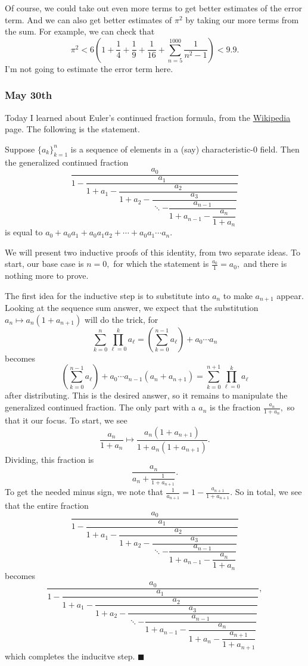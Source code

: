 Of course, we could take out even more terms to get better estimates of the error term. And we can also get better estimates of $\pi^2$ by taking our more terms from the sum. For example, we can check that
\[\pi^2<6\left(1+\frac{1}{4}+\frac{1}{9}+\frac{1}{16}+\sum_{n=5}^{1000}\frac{1}{n^{2}-1}\right)<9.9.\]
I'm not going to estimate the error term here.

\subsubsection{May 30th}
Today I learned about Euler's continued fraction formula, from the \href{https://en.wikipedia.org/wiki/Euler's_continued_fraction_formula}{Wikipedia} page. The following is the statement.
\begin{theorem}
    Suppose $\{a_k\}_{k=1}^n$ is a sequence of elements in a (say) characteristic-$0$ field. Then the generalized continued fraction
    \[\dfrac{a_0}{1-\dfrac{a_1}{1+a_1-\dfrac{a_2}{1+a_2-\dfrac{a_3}{\ddots-\dfrac{a_{n-1}}{1+a_{n-1}-\dfrac{a_n}{1+a_n}}}}}}\]
    is equal to $a_0+a_0a_1+a_0a_1a_2+\cdots+a_0a_1\cdots a_n.$
\end{theorem}
We will present two inductive proofs of this identity, from two separate ideas. To start, our base case is $n=0,$ for which the statement is $\frac{a_0}1=a_0,$ and there is nothing more to prove.

The first idea for the inductive step is to substitute into $a_n$ to make $a_{n+1}$ appear. Looking at the sequence sum answer, we expect that the substitution $a_n\mapsto a_n(1+a_{n+1})$ will do the trick, for
\[\sum_{k=0}^n\prod_{\ell=0}^ka_\ell=\left(\sum_{k=0}^{n-1}a_\ell\right)+a_0\cdots a_n\]
becomes
\[\left(\sum_{k=0}^{n-1}a_\ell\right)+a_0\cdots a_{n-1}(a_n+a_{n+1})=\sum_{k=0}^{n+1}\prod_{\ell=0}^ka_\ell\]
after distributing. This is the desired answer, so it remains to manipulate the generalized continued fraction. The only part with a $a_n$ is the fraction $\frac{a_n}{1+a_n},$ so that it our focus. To start, we see
\[\frac{a_n}{1+a_n}\mapsto\frac{a_n(1+a_{n+1})}{1+a_n(1+a_{n+1})}.\]
Dividing, this fraction is
\[\frac{a_n}{a_n+\frac1{1+a_{n+1}}}.\]
To get the needed minus sign, we note that $\frac1{a_{n+1}}=1-\frac{a_{n+1}}{1+a_{n+1}}.$ So in total, we see that the entire fraction
\[\dfrac{a_0}{1-\dfrac{a_1}{1+a_1-\dfrac{a_2}{1+a_2-\dfrac{a_3}{\ddots-\dfrac{a_{n-1}}{1+a_{n-1}-\dfrac{a_n}{1+a_n}}}}}}\]
becomes
\[\dfrac{a_0}{1-\dfrac{a_1}{1+a_1-\dfrac{a_2}{1+a_2-\dfrac{a_3}{\ddots-\dfrac{a_{n-1}}{1+a_{n-1}-\dfrac{a_n}{1+a_n-\dfrac{a_{n+1}}{1+a_{n+1}}}}}}}},\]
which completes the inducitve step. $\blacksquare$

